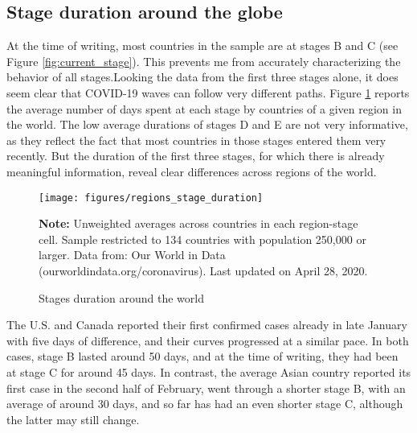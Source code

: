 \documentclass[12pt,english]{article}
\begin{document}
\subsection{Stage duration around the globe}

At the time of writing, most countries in the sample are at stages B and C (see Figure \ref{fig:current_stage}). This prevents me from accurately characterizing the behavior of all stages.Looking the data from the first three stages alone, it does seem clear that COVID-19 waves can follow very different paths. Figure \ref{fig:stage_by_region} reports the average number of days spent at each stage by countries of a given region in the world. The low average durations of stages D and E are not very informative, as they reflect the fact that most countries in those stages entered them very recently. But the duration of the first three stages, for which there is already meaningful information, reveal clear differences across regions of the world.

\begin{figure}[H]
	\singlespacing
	\centering
	 \caption{Stages duration around the world}  \label{fig:stage_by_region}
	\resizebox{0.7\width}{!} {
		\begin{threeparttable}
 			  \texttt{[image: figures/regions\_stage\_duration]}
  			 \begin{tablenotes}[flushleft]\vspace*{-7bp}
			\item \textbf{Note:} Unweighted averages across countries in each region-stage cell. Sample restricted to 134 countries with population 250,000 or larger. Data from: Our World in Data (ourworldindata.org/coronavirus). Last updated on April 28, 2020.
			 \end{tablenotes}
  		\end{threeparttable}
 		}
  	 \onehalfspacing
\end{figure}

The U.S. and Canada reported their first confirmed cases already in late January with five days of difference, and their curves progressed at a similar pace. In both cases, stage B lasted around 50 days, and at the time of writing, they had been at stage C for around 45 days.  In contrast, the average Asian country reported its first case in the second half of February, went through a shorter stage B, with an average of around 30 days, and so far has had an even shorter stage C, although the latter may still change.
\end{document}
